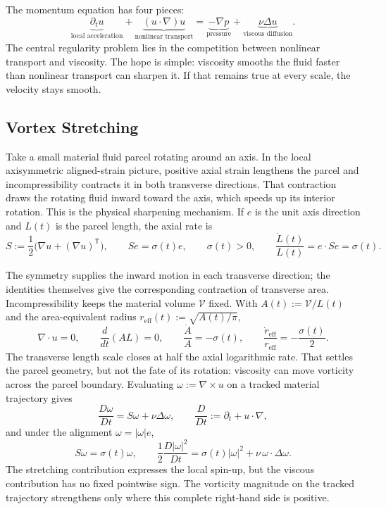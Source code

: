 
The momentum equation has four pieces:
\[
  \underbrace{\partial_t u}_{\text{local acceleration}}
  +
  \underbrace{(u\cdot\nabla)u}_{\text{nonlinear transport}}
  =
  \underbrace{-\nabla p}_{\text{pressure}}
  +
  \underbrace{\nu\Delta u}_{\text{viscous diffusion}}.
\]
The central regularity problem lies in the competition between nonlinear transport and viscosity.
The hope is simple: viscosity smooths the fluid faster than nonlinear transport can sharpen it.
If that remains true at every scale, the velocity stays smooth.

\subsection{Vortex Stretching}\label{sub:ThePerfectlyStretchingVortex}

Take a small material fluid parcel rotating around an axis. In the local axisymmetric aligned-strain picture, positive axial strain lengthens the parcel and incompressibility contracts it in both transverse directions. That contraction draws the rotating fluid inward toward the axis, which speeds up its interior rotation. This is the physical sharpening mechanism. If \(e\) is the unit axis direction and \(L(t)\) is the parcel length, the axial rate is
\[
  S:=\frac12\bigl(\nabla u+(\nabla u)^{\mathsf T}\bigr),
  \qquad
  Se=\sigma(t)e,
  \qquad
  \sigma(t)>0,
  \qquad
  \frac{\dot L(t)}{L(t)}
  =
  e\cdot Se
  =
  \sigma(t).
\]

The symmetry supplies the inward motion in each transverse direction; the identities themselves give the corresponding contraction of transverse area. Incompressibility keeps the material volume \(\mathcal V\) fixed. With \(A(t):=\mathcal V/L(t)\) and the area-equivalent radius \(r_{\mathrm{eff}}(t):=\sqrt{A(t)/\pi}\),
\[
  \nabla\cdot u=0,
  \qquad
  \frac{d}{dt}(A L)=0,
  \qquad
  \frac{\dot A}{A}=-\sigma(t),
  \qquad
  \frac{\dot r_{\mathrm{eff}}}{r_{\mathrm{eff}}}
  =
  -\frac{\sigma(t)}{2}.
\]
The transverse length scale closes at half the axial logarithmic rate. That settles the parcel geometry, but not the fate of its rotation: viscosity can move vorticity across the parcel boundary. Evaluating \(\omega:=\nabla\times u\) on a tracked material trajectory gives
\[
  \frac{D\omega}{Dt}
  =
  S\omega+\nu\Delta\omega,
  \qquad
  \frac{D}{Dt}
  :=
  \partial_t+u\cdot\nabla,
\]
and under the alignment \(\omega=|\omega|e\),
\[
  S\omega
  =
  \sigma(t)\omega,
  \qquad
  \frac12\frac{D|\omega|^2}{Dt}
  =
  \sigma(t)|\omega|^2
  +
  \nu\,\omega\cdot\Delta\omega.
\]
The stretching contribution expresses the local spin-up, but the viscous contribution has no fixed pointwise sign. The vorticity magnitude on the tracked trajectory strengthens only where this complete right-hand side is positive.

